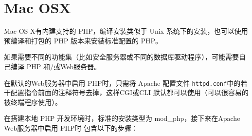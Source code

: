 \section{Mac OSX}

Mac OS X有内建支持的 PHP，编译安装类似于 Unix 系统下的安装，也可以使用预编译和打包的 PHP 版本来安装标准配置的 PHP。

如果需要不同的功能集（比如安全服务器或不同的数据库驱动程序），可能需要自己编译 PHP 和/或Web服务器。

在默认的Web服务器中启用 PHP时，只需将 Apache 配置文件 \texttt{httpd.conf}中的若干配置指令前面的注释符号去掉，这样CGI或CLI 默认都可以使用（可以很容易的被终端程序使用）。


在搭建本地 PHP 开发环境时，标准的安装类型为 mod\_php，接下来在Apache Web服务器中启用 PHP时 包含以下的步骤：


